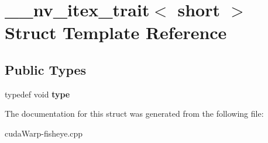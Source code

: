 \hypertarget{struct____nv__itex__trait_3_01short_01_4}{}\section{\+\_\+\+\_\+nv\+\_\+itex\+\_\+trait$<$ short $>$ Struct Template Reference}
\label{struct____nv__itex__trait_3_01short_01_4}
\subsection*{Public Types}
\begin{DoxyCompactItemize}
\item 
typedef void {\bfseries type}\hypertarget{struct____nv__itex__trait_3_01short_01_4_aa3ffef4d0b86895123f0877a2cd5dc48}{}\label{struct____nv__itex__trait_3_01short_01_4_aa3ffef4d0b86895123f0877a2cd5dc48}

\end{DoxyCompactItemize}


The documentation for this struct was generated from the following file\+:\begin{DoxyCompactItemize}
\item 
cuda\+Warp-\/fisheye.\+cpp\end{DoxyCompactItemize}
